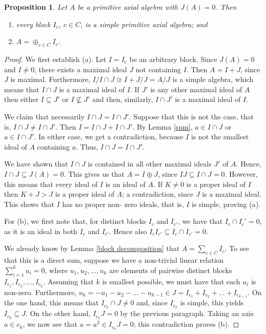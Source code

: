 \documentclass[10pt,a4paper]{amsart}
\newtheorem{proposition}{Proposition}
\begin{document}
\begin{proposition}
Let $A$ be a primitive axial algebra with $J(A)=0$. Then
%
\begin{enumerate}
\item[(a)] every block $I_c$, $c\in C$, is a simple primitive axial algebra; and
\item[(b)] $A=\oplus_{c\in C}I_c$.
\end{enumerate}
\end{proposition}

\begin{proof}
We first establish (a). Let $I=I_c$ be an arbitrary block. Since $J(A)=0$ and $I\neq 
0$, there exists a maximal ideal $J$ not containing $I$. Then $A=I+J$, since $J$ is 
maximal. Furthermore, $I/I\cap J\cong I+J/J=A/J$ is a simple algebra, which means 
that $I\cap J$ is a maximal ideal of $I$. If $J'$ is any other maximal ideal of $A$ 
then either $I\subseteq J'$ or $I\not\subseteq J'$ and then, similarly, $I\cap J'$ is 
a maximal ideal of $I$. 

We claim that necessarily $I\cap J=I\cap J'$. Suppose that this is not the case, that 
is, $I\cap J\neq I\cap J'$. Then $I=I\cap J+I\cap J'$. By Lemma \ref{sum}, $a\in 
I\cap J$ or $a\in I\cap J'$. In either case, we get a contradiction, because $I$ is 
not the smallest ideal of $A$ containing $a$. Thus, $I\cap J=I\cap J'$.

We have shown that $I\cap J$ is contained in all other maximal ideals $J'$ of $A$. 
Hence, $I\cap J\subseteq J(A)=0$. This gives us that $A=I\oplus J$, since 
$IJ\subseteq I\cap J=0$. However, this means that every ideal of $I$ is an ideal of 
$A$. If $K\neq 0$ is a proper ideal of $I$ then $K+J>J$ is a proper ideal of $A$; a 
contradiction, since $J$ is a maximal ideal. This shows that $I$ has no proper non-
zero ideals, that is, $I$ is simple, proving (a).

For (b), we first note that, for distinct blocks $I_c$ and $I_{c'}$, we have that 
$I_c\cap I_c'=0$, as it is an ideal in both $I_c$ and $I_{c'}$. Hence also 
$I_cI_{c'}\subseteq I_c\cap I_{c'}=0$.

We already know by Lemma \ref{block decomposition} that $A=\sum_{c\in C}I_c$. To see 
that this is a direct sum, suppose we have a non-trivial linear relation 
$\sum_{i=1}^ku_i=0$, where $u_1,u_2,\ldots,u_k$ are elements of pairwise distinct 
blocks $I_{c_1},I_{c_2},\ldots,I_{c_k}$. Assuming that $k$ is smallest possible, we 
must have that each $u_i$ is non-zero. Furthermore, $u_k=-u_1-u_2-\ldots-u_{k-1}\in 
J=I_{c_1}+I_{c_2}+\ldots+I_{c_{k-1}}$. On the one hand, this means that $I_{c_k}\cap 
J\neq 0$ and, since $I_{c_k}$ is simple, this yields $I_{c_k}\subseteq J$. On the 
other hand, $I_{c_k}J=0$ by the previous paragraph. Taking an axis $a\in c_k$, we now 
see that $a=a^2\in I_{c_k}J=0$; this contradiction proves (b).
\end{proof}
\end{document}
